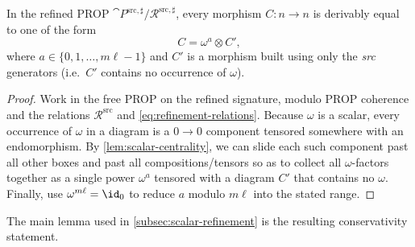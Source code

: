 \begin{lemma}\label{lem:scalar-extraction}
In the refined PROP $\cat{P}^{\mathrm{src},\sharp}/\mathcal{R}^{\mathrm{src},\sharp}$,
every morphism $C:n\to n$ is derivably equal to one of the form
\begin{equation}\label{eq:scalar-normal-form}
  C = \omega^{a}\otimes C',
\end{equation}
where $a\in\{0,1,\dots,m\ell-1\}$ and $C'$ is a morphism built using only the
\emph{src} generators (i.e.\ $C'$ contains no occurrence of $\omega$).
\end{lemma}
\begin{proof}
Work in the free PROP on the refined signature, modulo PROP coherence and the relations
$\mathcal{R}^{\mathrm{src}}$ and \eqref{eq:refinement-relations}.  Because $\omega$ is a scalar,
every occurrence of $\omega$ in a diagram is a $0\to 0$ component tensored somewhere with an
endomorphism.  By \cref{lem:scalar-centrality}, we can slide each such component past all other
boxes and past all compositions/tensors so as to collect all $\omega$-factors together as a single
power $\omega^{a}$ tensored with a diagram $C'$ that contains no $\omega$.
Finally, use $\omega^{m\ell}=\id_0$ to reduce $a$ modulo $m\ell$ into the stated range.
\end{proof}


The main lemma used in \cref{subsec:scalar-refinement} is the resulting conservativity statement.


